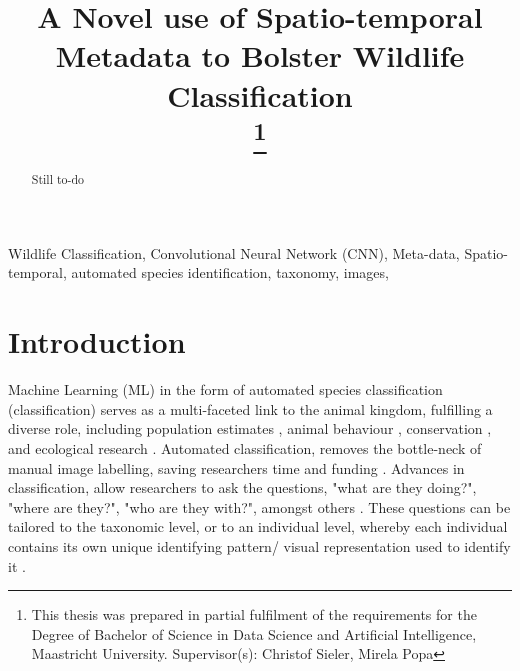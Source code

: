 \documentclass[conference]{IEEEtran}
\begin{document}
\title{A Novel use of Spatio-temporal Metadata to Bolster Wildlife Classification\\
\thanks{This thesis was prepared in partial fulfilment of the requirements for the Degree of Bachelor of Science in Data Science and Artificial Intelligence, Maastricht University. Supervisor(s): Christof Sieler, Mirela Popa}
}

\author{
}

\maketitle

\begin{abstract}
    Still to-do
\end{abstract}

\begin{IEEEkeywords}
Wildlife Classification, Convolutional Neural Network (CNN), Meta-data, Spatio-temporal, automated species identification, taxonomy, images, 
\end{IEEEkeywords}

\section{Introduction}
    Machine Learning (ML) in the form of automated species classification (classification) serves as a multi-faceted link to the animal kingdom, fulfilling a diverse role, including population estimates \cite{Miao_Gaynor_Wang_Liu_Muellerklein_Norouzzadeh_McInturff_Bowie_Nathan_Yu_2019} \cite{Schneider_Greenberg_Taylor_Kremer_2020}, animal behaviour \cite{Chen_Little_Mihaylova_Delahay_Cox_2019}, conservation \cite{Wäldchen_Mäder_2018} \cite{Simões_Bouveyron_Precioso_2023}, and ecological research \cite{Nazir_Kaleem_2021} . Automated classification, removes the bottle-neck of manual image labelling, saving researchers time and funding \cite{Chen_Little_Mihaylova_Delahay_Cox_2019} \cite{Miao_Gaynor_Wang_Liu_Muellerklein_Norouzzadeh_McInturff_Bowie_Nathan_Yu_2019}.
    Advances in classification, allow researchers to ask the questions, "what are they doing?", "where are they?", "who are they with?", amongst others \cite{Gomez_Villa_Salazar_Vargas_2017}. These questions can be tailored to the taxonomic level, or to an individual level, whereby each individual contains its own unique identifying pattern/ visual representation used to identify it \cite{Clapham_Miller_Nguyen_Van_Horn_2022}. 
    \\
\end{document}
